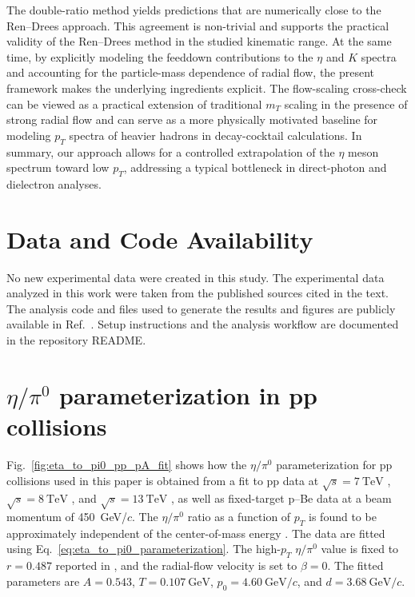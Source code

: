 \documentclass[%
 reprint,
 amsmath,amssymb,
 aps,
prc,
]{revtex4-2}
\begin{document}
The double-ratio method yields predictions that are numerically close to the Ren--Drees approach. This agreement is non-trivial and supports the practical validity of the Ren--Drees method in the studied kinematic range. At the same time, by explicitly modeling the feeddown contributions to the $\eta$ and $K$ spectra and accounting for the particle-mass dependence of radial flow, the present framework makes the underlying ingredients explicit. The flow-scaling cross-check can be viewed as a practical extension of traditional $m_T$ scaling in the presence of strong radial flow and can serve as a more physically motivated baseline for modeling $p_T$ spectra of heavier hadrons in decay-cocktail calculations. In summary, our approach allows for a controlled extrapolation of the $\eta$ meson spectrum toward low $p_T$, addressing a typical bottleneck in direct-photon and dielectron analyses. 

\section*{Data and Code Availability}
No new experimental data were created in this study. The experimental data analyzed in this work were taken from the published sources cited in the text. The analysis code and files used to generate the results and figures are publicly available in Ref.~\cite{reygers_eta_pi0_blastwave_feeddown_2026}. Setup instructions and the analysis workflow are documented in the repository README.

\appendix

\section{\boldmath $\eta/\pi^0$ parameterization in pp collisions}
Fig.~\ref{fig:eta_to_pi0_pp_pA_fit} shows how the $\eta/\pi^0$ parameterization for pp collisions used in this paper is obtained from a fit to pp data at $\sqrt{s}=7~\mathrm{TeV}$ \cite{ALICE:2012wos}, $\sqrt{s}=8~\mathrm{TeV}$ \cite{ALICE:2017ryd}, and $\sqrt{s}=13~\mathrm{TeV}$ \cite{ALICE:2024vgi}, as well as fixed-target p--Be data at a beam momentum of 450~GeV/$c$. The $\eta/\pi^0$ ratio as a function of $p_T$ is found to be approximately independent of the center-of-mass energy \cite{Ren:2021pzi}. The data are fitted using Eq.~\ref{eq:eta_to_pi0_parameterization}. The high-$p_T$ $\eta/\pi^0$ value is fixed to $r=0.487$ reported in \cite{Ren:2021pzi}, and the radial-flow velocity is set to $\beta = 0$. The fitted parameters are $A=0.543$, $T=0.107~\mathrm{GeV}$, $p_0=4.60~\mathrm{GeV}/c$, and $d=3.68~\mathrm{GeV}/c$.
\end{document}
